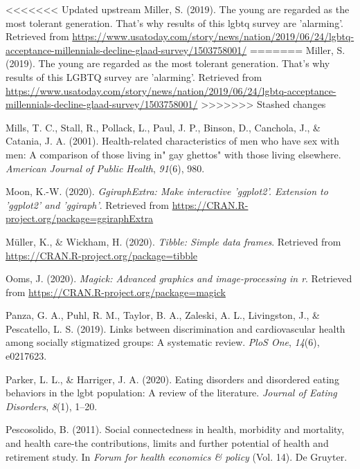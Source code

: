 \documentclass[
  english,
  man,floatsintext]{apa6}
\begin{document}
\begin{CSLReferences}{1}{0}
\leavevmode\hypertarget{ref-Miller2019}{}%
<<<<<<< Updated upstream
Miller, S. (2019). The young are regarded as the most tolerant generation. That's why results of this lgbtq survey are 'alarming'. Retrieved from \url{https://www.usatoday.com/story/news/nation/2019/06/24/lgbtq-acceptance-millennials-decline-glaad-survey/1503758001/}
=======
Miller, S. (2019). The young are regarded as the most tolerant generation. That's why results of this LGBTQ survey are 'alarming'. Retrieved from \url{https://www.usatoday.com/story/news/nation/2019/06/24/lgbtq-acceptance-millennials-decline-glaad-survey/1503758001/}
>>>>>>> Stashed changes

\leavevmode\hypertarget{ref-mills2001}{}%
Mills, T. C., Stall, R., Pollack, L., Paul, J. P., Binson, D., Canchola, J., \& Catania, J. A. (2001). Health-related characteristics of men who have sex with men: A comparison of those living in" gay ghettos" with those living elsewhere. \emph{American Journal of Public Health}, \emph{91}(6), 980.

\leavevmode\hypertarget{ref-R-ggiraphExtra}{}%
Moon, K.-W. (2020). \emph{GgiraphExtra: Make interactive 'ggplot2'. Extension to 'ggplot2' and 'ggiraph'}. Retrieved from \url{https://CRAN.R-project.org/package=ggiraphExtra}

\leavevmode\hypertarget{ref-R-tibble}{}%
Müller, K., \& Wickham, H. (2020). \emph{Tibble: Simple data frames}. Retrieved from \url{https://CRAN.R-project.org/package=tibble}

\leavevmode\hypertarget{ref-R-magick}{}%
Ooms, J. (2020). \emph{Magick: Advanced graphics and image-processing in r}. Retrieved from \url{https://CRAN.R-project.org/package=magick}

\leavevmode\hypertarget{ref-panza2019}{}%
Panza, G. A., Puhl, R. M., Taylor, B. A., Zaleski, A. L., Livingston, J., \& Pescatello, L. S. (2019). Links between discrimination and cardiovascular health among socially stigmatized groups: A systematic review. \emph{PloS One}, \emph{14}(6), e0217623.

\leavevmode\hypertarget{ref-parker2020}{}%
Parker, L. L., \& Harriger, J. A. (2020). Eating disorders and disordered eating behaviors in the lgbt population: A review of the literature. \emph{Journal of Eating Disorders}, \emph{8}(1), 1--20.

\leavevmode\hypertarget{ref-pescosolido2011}{}%
Pescosolido, B. (2011). Social connectedness in health, morbidity and mortality, and health care-the contributions, limits and further potential of health and retirement study. In \emph{Forum for health economics \& policy} (Vol. 14). De Gruyter.


\end{CSLReferences}
\end{document}
